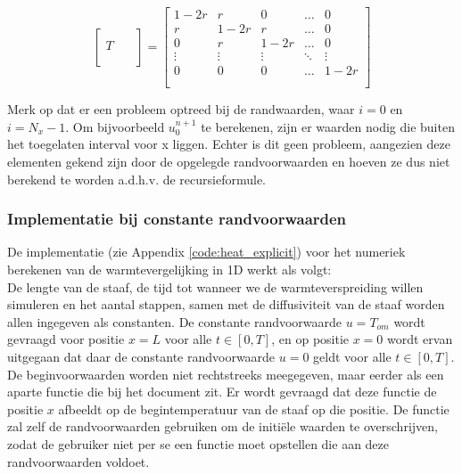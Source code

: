 \documentclass[a4paper,kulak]{kulakarticle} %
\begin{document}
\begin{equation}
	\begin{bmatrix}
		\qquad \\
		T \\
		\\ 
	\end{bmatrix}
	=
	\begin{bmatrix}
		1-2r	&	r		&	0		&	\dots	&	0 		\\
		r		&	1-2r	&	r		&	\dots	&	0		\\
		0		&	r		&	1-2r	&	\dots	&	0		\\
		\vdots	&	\vdots	&	\vdots	&	\ddots	&	\vdots	\\
		0		&	0		&	0		&	\dots	&	1-2r	\\
		\\ 
	\end{bmatrix}
\end{equation}

Merk op dat er een probleem optreed bij de randwaarden, waar $i = 0$ en $i = N_x-1$. Om bijvoorbeeld $u_0^{n+1}$ te berekenen, zijn er waarden nodig die buiten het toegelaten interval voor x liggen. Echter is dit geen probleem, aangezien deze elementen gekend zijn door de opgelegde randvoorwaarden en hoeven ze dus niet berekend te worden a.d.h.v. de recursieformule.

\subsubsection{Implementatie bij constante randvoorwaarden}
\label{sec:implementatie_expliciet_constant}

De implementatie  (zie Appendix \ref{code:heat_explicit}) voor het numeriek berekenen van de warmtevergelijking in 1D werkt als volgt: \\
De lengte van de staaf, de tijd tot wanneer we de warmteverspreiding willen simuleren en het aantal stappen, samen met de diffusiviteit van de staaf worden allen ingegeven als constanten. De constante randvoorwaarde $u = T_{om}$ wordt gevraagd voor positie $x = L$ voor alle $t \in [0, T]$, en op positie $x = 0$ wordt ervan uitgegaan dat daar de constante randvoorwaarde $u = 0$ geldt voor alle $t \in [0, T]$. De beginvoorwaarden worden niet rechtstreeks meegegeven, maar eerder als een aparte functie  die bij het document zit. Er wordt gevraagd dat deze functie de positie $x$ afbeeldt op de begintemperatuur van de staaf op die positie. De functie  zal zelf de randvoorwaarden gebruiken om de initiële waarden te overschrijven, zodat de gebruiker niet per se een functie moet opstellen die aan deze randvoorwaarden voldoet.
\end{document}
